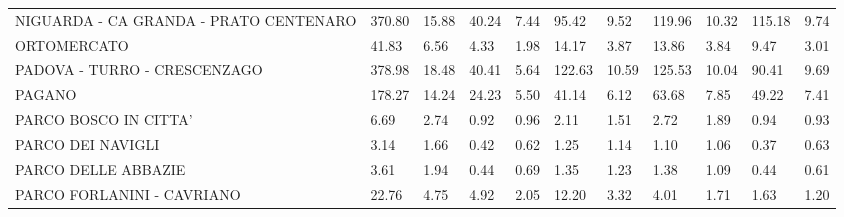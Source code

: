 \begin{table}[H]
{{\begin{tabular}{lp{1.3cm}p{1.3cm}p{1.3cm}p{1.3cm}p{1.3cm}p{1.3cm}p{1.3cm}p{1.3cm}p{1.3cm}p{1.3cm}}
NIGUARDA - CA GRANDA - PRATO CENTENARO  &                    370.80 &                 15.88 &                       40.24 &                    7.44 &                       95.42 &                    9.52 &                      119.96 &                   10.32 &                    115.18 &                  9.74 \\
ORTOMERCATO                                        &                     41.83 &                  6.56 &                        4.33 &                    1.98 &                       14.17 &                    3.87 &                       13.86 &                    3.84 &                      9.47 &                  3.01 \\
PADOVA - TURRO - CRESCENZAGO                       &                    378.98 &                 18.48 &                       40.41 &                    5.64 &                      122.63 &                   10.59 &                      125.53 &                   10.04 &                     90.41 &                  9.69 \\
PAGANO                                             &                    178.27 &                 14.24 &                       24.23 &                    5.50 &                       41.14 &                    6.12 &                       63.68 &                    7.85 &                     49.22 &                  7.41 \\
PARCO BOSCO IN CITTA'                              &                      6.69 &                  2.74 &                        0.92 &                    0.96 &                        2.11 &                    1.51 &                        2.72 &                    1.89 &                      0.94 &                  0.93 \\
PARCO DEI NAVIGLI                                  &                      3.14 &                  1.66 &                        0.42 &                    0.62 &                        1.25 &                    1.14 &                        1.10 &                    1.06 &                      0.37 &                  0.63 \\
PARCO DELLE ABBAZIE                                &                      3.61 &                  1.94 &                        0.44 &                    0.69 &                        1.35 &                    1.23 &                        1.38 &                    1.09 &                      0.44 &                  0.61 \\
PARCO FORLANINI - CAVRIANO                         &                     22.76 &                  4.75 &                        4.92 &                    2.05 &                       12.20 &                    3.32 &                        4.01 &                    1.71 &                      1.63 &                  1.20 \\

\end{tabular}}}
\end{table}
